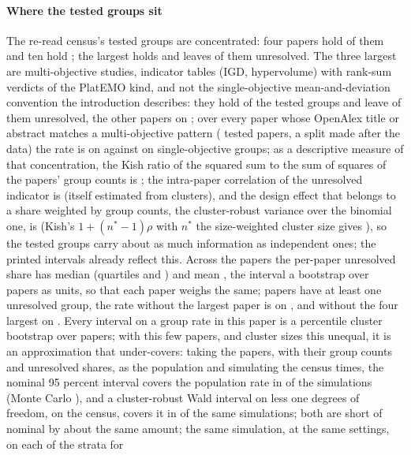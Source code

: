 \documentclass[preprint,review,12pt]{elsarticle}
\begin{document}
\paragraph{Where the tested groups sit} The re-read census's tested groups are concentrated: four papers hold \nCrcPpTopFourShare{} of them and ten hold \nCrcPpTopTenShare{}; the largest holds \nCrcPpLargestPaperTested{} and leaves \nCrcPpLargestPaperFail{} of them unresolved. The three largest are multi-objective studies, indicator tables (IGD, hypervolume) with rank-sum verdicts of the PlatEMO kind, and not the single-objective mean-and-deviation convention the introduction describes: they hold \nCrcPpTopThreeShare{} of the tested groups and leave \nCrcPpTopThreeOnlyFail{} of them unresolved, the other \nCrcPpWithoutTopThreeTestedPapers{} papers \nCrcPpWithoutTopThreeFail{} \nCrcPpWithoutTopThreeFailCi{} on \nCrcPpWithoutTopThreeTested{}; over every paper whose OpenAlex title or abstract matches a multi-objective pattern (\nCrcMoPapersTested{} tested papers, a split made after the data) the rate is \nCrcMoFail{} on \nCrcMoTested{} against \nCrcSoFail{} \nCrcSoFailCi{} on \nCrcSoTested{} single-objective groups; as a descriptive measure of that concentration, the Kish ratio of the squared sum to the sum of squares of the papers' group counts is \nCrcPpEffectivePapers{}; the intra-paper correlation of the unresolved indicator is \nCrcPpIcc{} (itself estimated from \nCrcPpPapers{} clusters), and the design effect that belongs to a share weighted by group counts, the cluster-robust variance over the binomial one, is \nCrcPpDesignEffect{} (Kish's $1 + (n^{*} - 1)\rho$ with $n^{*}$ the size-weighted cluster size gives \nCrcPpDesignEffectKish{}), so the \nCrcAllTested{} tested groups carry about as much information as \nCrcPpEffectiveGroups{} independent ones; the printed intervals already reflect this. Across the \nCrcPpPapers{} papers the per-paper unresolved share has median \nCrcPpMedianRate{} (quartiles \nCrcPpQORate{} and \nCrcPpQTRate{}) and mean \nCrcPpMacroRate{} \nCrcPpMacroRateCi{}, the interval a bootstrap over papers as units, so that each paper weighs the same; \nCrcPpPapersAnyFail{} papers have at least one unresolved group, the rate without the largest paper is \nCrcPpWithoutLargestFail{} \nCrcPpWithoutLargestFailCi{} on \nCrcPpWithoutLargestTested{}, and without the four largest \nCrcPpWithoutTopFourFail{} \nCrcPpWithoutTopFourFailCi{} on \nCrcPpWithoutTopFourTested{}. Every interval on a group rate in this paper is a percentile cluster bootstrap over papers; with this few papers, and cluster sizes this unequal, it is an approximation that under-covers: taking the \nCrcPpPapers{} papers, with their group counts and unresolved shares, as the population and simulating the census \nCrcPpBootCoverageSims{} times, the nominal 95 percent interval covers the population rate in \nCrcPpBootCoverage{} of the simulations (Monte Carlo \nCrcPpBootCoverageMcCi{}), and a cluster-robust Wald interval on \nCrcPpPapers{} less one degrees of freedom, \nCrcPpWaldCi{} on the census, covers it in \nCrcPpWaldCoverage{} of the same simulations; both are short of nominal by about the same amount; the same simulation, at the same settings, on each of the \nCrcCovStrata{} strata for 
\end{document}

